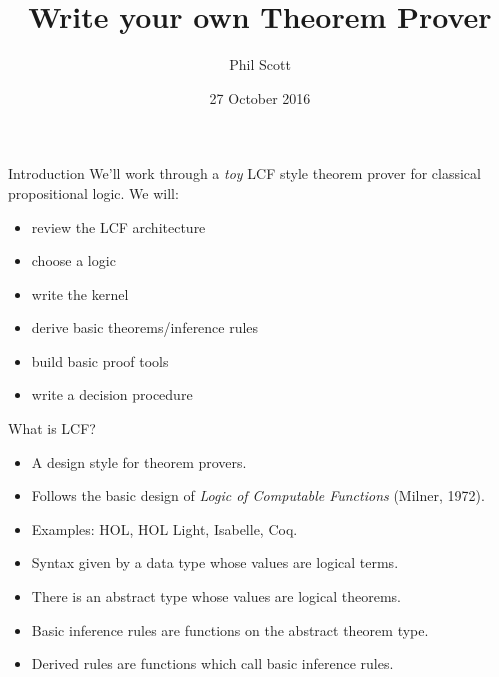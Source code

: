 \documentclass[presentation]{beamer}
\author{Phil Scott}
\date{27 October 2016}
\title{Write your own Theorem Prover}
\begin{document}
\maketitle

\begin{frame}[label={sec:orgheadline1}]{Introduction}
We'll work through a \emph{toy} LCF style theorem prover for classical propositional logic. We
will:

\begin{itemize}
\item review the LCF architecture
\item choose a logic
\item write the kernel
\item derive basic theorems/inference rules
\item build basic proof tools
\item write a decision procedure
\end{itemize}
\end{frame}

\begin{frame}[label={sec:orgheadline2}]{What is LCF?}
\begin{itemize}
\item A design style for theorem provers.
\item Follows the basic design of \emph{Logic of Computable Functions} (Milner, 1972).
\item Examples: HOL, HOL Light, Isabelle, Coq.
\item Syntax given by a data type whose values are logical terms.
\item There is an abstract type whose values are logical theorems.
\item Basic inference rules are functions on the abstract theorem type.
\item Derived rules are functions which call basic inference rules.
\end{itemize}
\end{frame}
\end{document}
